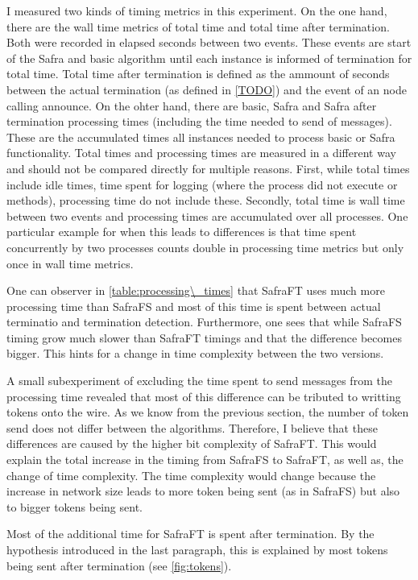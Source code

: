 I measured two kinds of timing metrics in this experiment.
On the one hand, there are the wall time metrics of total time and total time after termination.
Both were recorded in elapsed seconds between two events. 
These events are start of the Safra and basic algorithm until each instance is informed of termination for total time. 
Total time after termination is defined as the ammount of seconds between the actual termination (as defined in \cref{TODO}) and the event of an node calling
announce. %
On the ohter hand, there are basic, Safra and Safra after termination processing times (including the time needed to send of messages).
These are the accumulated times all instances needed to process basic or Safra functionality.
Total times and processing times are measured in a different way and should not be compared directly for multiple reasons. 
First, while total times include idle times, time spent for logging (where the process did not execute or methods), processing time do not include these.
Secondly, total time is wall time between two events and processing times are accumulated over all processes. 
One particular example for when this leads to differences is that time spent concurrently by two processes counts double in processing time metrics but only once in wall time metrics.

One can observer in \cref{table:processing\_times} that SafraFT uses much more processing time than SafraFS and most of this time is spent between actual terminatio and termination detection.
Furthermore, one sees that while SafraFS timing grow much slower than SafraFT timings and that the difference becomes bigger. 
This hints for a change in time complexity between the two versions.

A small subexperiment of excluding the time spent to send messages from the processing time revealed that most of this difference can be tributed to writting tokens onto the wire. %
As we know from the previous section, the number of token send does not differ between the algorithms.
Therefore, I believe that these differences are caused by the higher bit complexity of SafraFT. 
This would explain the total increase in the timing from SafraFS to SafraFT, as well as, the change of time complexity.
The time complexity would change because the increase in network size leads to more token being sent (as in SafraFS) but also to bigger tokens being sent.

Most of the additional time for SafraFT is spent after termination.
By the hypothesis introduced in the last paragraph, this is explained by most tokens being sent after termination (see \cref{fig:tokens}).

